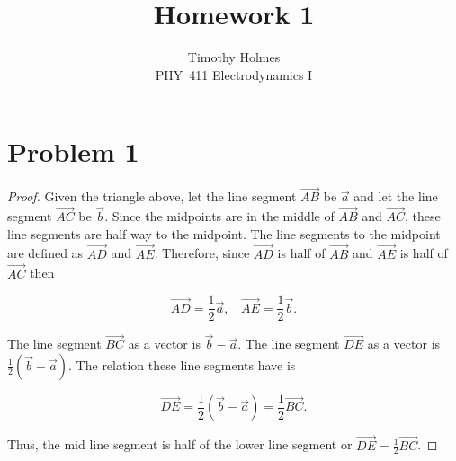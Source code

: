 \documentclass[11pt]{article}
\newcommand{\HWnum}{1}
\newcommand{\Subject}{PHY}
\begin{document}

\title{Homework {\HWnum}}
\author{Timothy Holmes \\ \Subject~411 Electrodynamics I}

\maketitle

\section*{Problem 1}

\begin{center}
\end{center}

\begin{proof}
Given the triangle above, let the line segment $\overrightarrow{AB}$ be $\vec{a}$ and let the line segment $\overrightarrow{AC}$ be $\vec{b}$. Since the midpoints are in the middle of $\overrightarrow{AB}$ and $\overrightarrow{AC}$, these line segments are half way to the midpoint. The line segments to the midpoint are defined as $\overrightarrow{AD}$ and $\overrightarrow{AE}$. Therefore, since  $\overrightarrow{AD}$  is half of $\overrightarrow{AB}$ and $\overrightarrow{AE}$  is half of $\overrightarrow{AC}$ then 

$$
\overrightarrow{AD} = \frac{1}{2}\vec{a}, ~~~~ \overrightarrow{AE} = \frac{1}{2}\vec{b}.
$$

The line segment $\overrightarrow{BC}$ as a vector is $\vec{b} - \vec{a}$. The line segment $\overrightarrow{DE}$ as a vector is $\frac{1}{2}(\vec{b} - \vec{a})$. The relation these line segments have is

$$
\overrightarrow{DE} = \frac{1}{2}(\vec{b} - \vec{a}) = \frac{1}{2} \overrightarrow{BC}.
$$

Thus, the mid line segment is half of the lower line segment or $\overrightarrow{DE} = \frac{1}{2}\overrightarrow{BC}$.

\end{proof}
\end{document}

